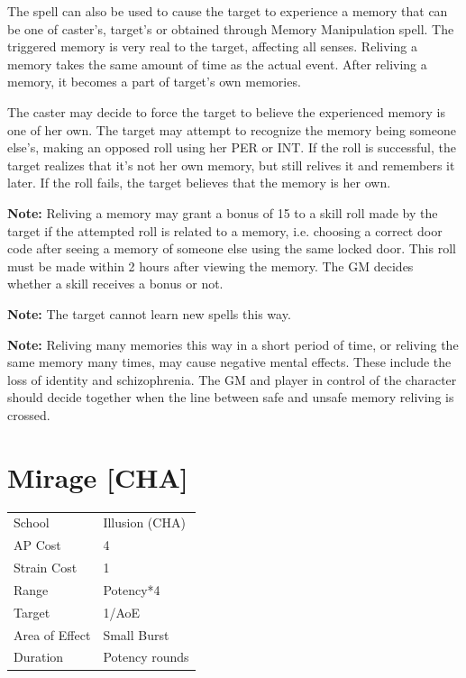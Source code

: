 \documentclass[11pt,a4paper,twocolumn]{book}
\begin{document}
The spell can also be used to cause the target to experience a memory that can be one of caster's, target's or obtained through Memory Manipulation spell. The triggered memory is very real to the target, affecting all senses. Reliving a memory takes the same amount of time as the actual event. After reliving a memory, it becomes a part of target's own memories.

The caster may decide to force the target to believe the experienced memory is one of her own. The target may attempt to recognize the memory being someone else's, making an opposed roll using her PER or INT. If the roll is successful, the target realizes that it's not her own memory, but still relives it and remembers it later. If the roll fails, the target believes that the memory is her own.

\textbf{Note:} Reliving a memory may grant a bonus of 15 to a skill roll made by the target if the attempted roll is related to a memory, i.e. choosing a correct door code after seeing a memory of someone else using the same locked door. This roll must be made within 2 hours after viewing the memory. The GM decides whether a skill receives a bonus or not.

\textbf{Note:} The target cannot learn new spells this way.

\textbf{Note:} Reliving many memories this way in a short period of time, or reliving the same memory many times, may cause negative mental effects. These include the loss of identity and schizophrenia. The GM and player in control of the character should decide together when the line between safe and unsafe memory reliving is crossed.


\section*{Mirage [CHA]}
{
	\begin{tabu} to 75mm{| X[l,4] | X[l,7] |}
		\hline
		School 			& Illusion (CHA) 		\\
        AP Cost	      	& 4 					\\
        Strain Cost     & 1 					\\
        Range     		& Potency*4 			\\
        Target      	& 1/AoE					\\
        Area of Effect  & Small Burst  	 		\\
        Duration     	& Potency rounds 		\\ \hline
	\end{tabu}
		
}
\end{document}
